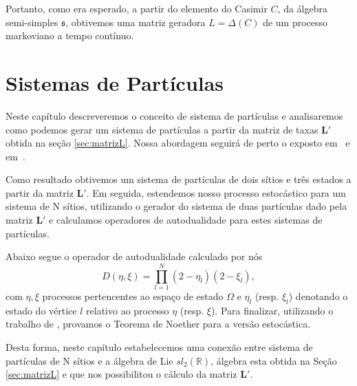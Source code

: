 \documentclass[twoside,openright,titlepage,numbers=noenddot,headinclude,  lineheaders footinclude=true,cleardoublepage=empty,
                                BCOR=5mm,paper=a4,fontsize=12pt ]{scrbook}
\theoremstyle{definition}
\begin{document}
Portanto, como era esperado, a partir do elemento do Casimir $C$, da álgebra semi-simples $\mathfrak{s}$,
obtivemos uma matriz geradora $L = \Delta(C)$ de um processo markoviano a tempo contínuo.

\chapter{Sistemas de Part\'iculas}
Neste capítulo descreveremos o conceito de sistema de 
partículas e analisaremos como podemos gerar um sistema de partículas
a partir da matriz de taxas $\bm{L}'$ obtida na seção \ref{sec:matrizL}. Nossa abordagem 
seguirá de perto o exposto em~\cite{durret2} e em~\cite{Nparticulas}.

Como resultado obtivemos um sistema de partículas de dois sítios e
três estados a partir da matriz $\bm{L}'$.  Em seguida, estendemos nosso processo estocástico 
 para um sistema
de N sítios, utilizando o gerador do sistema de duas partículas dado pela matriz $\bm{L}'$ e calculamos
operadores de autodualidade para estes sistemas de partículas.

Abaixo segue o operador de autodualidade calculado por nós
\[
D(\eta, \xi) = \prod_{l=1}^N (2 - \eta_l) (2- \xi_l),
\]
com $\eta, \xi$ processos pertencentes ao espaço de estado $\Omega$
e $\eta_l$ (resp. $\xi_l$) denotando o estado do vértice $l$ relativo ao
processo $\eta$ (resp. $\xi$). Para finalizar, utilizando o trabalho
de \cite{noether}, provamos o Teorema de Noether para a versão estocástica.

Desta forma, neste capítulo estabelecemos uma conexão entre sistema de partículas de N sítios
e a álgebra de Lie $sl_2(\mathbb{R})$, álgebra esta obtida na Seção \ref{sec:matrizL} e que
nos possibilitou o cálculo da matriz $\bm{L}'$.
\end{document}
